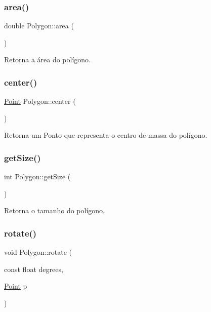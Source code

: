 \subsubsection{\texorpdfstring{area()}{area()}}
{\footnotesize\ttfamily double Polygon\+::area (\begin{DoxyParamCaption}{ }\end{DoxyParamCaption})}

Retorna a área do polígono. \mbox{\label{class_polygon_a29f2c1c836f16108ea14567728cda0c2}} 
\subsubsection{\texorpdfstring{center()}{center()}}
{\footnotesize\ttfamily \hyperlink{class_point}{Point} Polygon\+::center (\begin{DoxyParamCaption}{ }\end{DoxyParamCaption})}

Retorna um Ponto que representa o centro de massa do polígono. \mbox{\label{class_polygon_a9c28d2deb649781c79a21cee4d884403}} 
\subsubsection{\texorpdfstring{get\+Size()}{getSize()}}
{\footnotesize\ttfamily int Polygon\+::get\+Size (\begin{DoxyParamCaption}{ }\end{DoxyParamCaption})}

Retorna o tamanho do polígono. \mbox{\label{class_polygon_ae56a4c0d4e77bbbe8fa423ca5d33622a}} 
\subsubsection{\texorpdfstring{rotate()}{rotate()}}
{\footnotesize\ttfamily void Polygon\+::rotate (\begin{DoxyParamCaption}\item[{const float}]{degrees,  }\item[{\hyperlink{class_point}{Point}}]{p }\end{DoxyParamCaption})}

